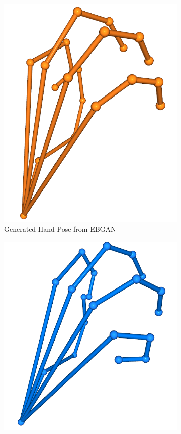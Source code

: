 \documentclass[10pt,twocolumn,letterpaper]{article}
\begin{document}
\begin{figure}[t]
\caption{EBGAN samples}
\label{fig:ebgansamples}
\centering
\begin{subfigure}[t]{0.23\textwidth}
\includegraphics[scale=0.15]{gangenerated.png}
\caption{Generated Hand Pose from EBGAN}
\end{subfigure}
\begin{subfigure}[t]{0.23\textwidth}
\includegraphics[scale=0.15]{realsample.png}

\end{subfigure}
\end{figure}
\end{document}
